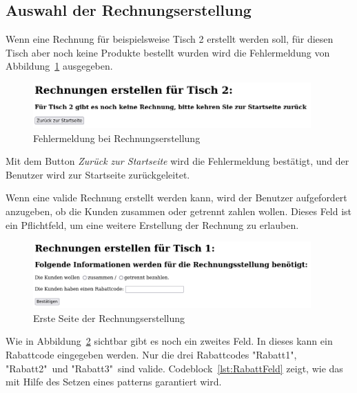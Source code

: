 \subsection{Auswahl der Rechnungserstellung} %
\label{sub:Auswahl der Rechnungserstellung}

Wenn eine Rechnung für beispielsweise Tisch 2 erstellt werden soll, für diesen Tisch aber noch keine Produkte bestellt wurden wird die Fehlermeldung von Abbildung~\ref{abb:RechnungFehler} ausgegeben.

\begin{figure}[htb]
  \centering
  \includegraphics[width=0.95\textwidth]{images/RechnungFehler.png}
  \caption[Fehlermeldung bei Rechnungserstellung]{Fehlermeldung bei Rechnungserstellung}
  \label{abb:RechnungFehler}
\end{figure}

Mit dem Button \textit{Zurück zur Startseite} wird die Fehlermeldung bestätigt, und der Benutzer wird zur Startseite zurückgeleitet.

Wenn eine valide Rechnung erstellt werden kann, wird der Benutzer aufgefordert anzugeben, ob die Kunden zusammen oder getrennt zahlen wollen.
Dieses Feld ist ein Pflichtfeld, um eine weitere Erstellung der Rechnung zu erlauben.

\begin{figure}[htb]
  \centering
  \includegraphics[width=0.95\textwidth]{images/InitialRechnung.png}
  \caption[Erste Seite der Rechnungserstellung]{Erste Seite der Rechnungserstellung}
  \label{abb:InitialRechnung}
\end{figure}

Wie in Abbildung~\ref{abb:InitialRechnung} sichtbar gibt es noch ein zweites Feld.
In dieses kann ein Rabattcode eingegeben werden.
Nur die drei Rabattcodes "Rabatt1", "Rabatt2"\ und "Rabatt3"\ sind valide.
Codeblock~\ref{lst:RabattFeld} zeigt, wie das mit Hilfe des Setzen eines patterns garantiert wird.

